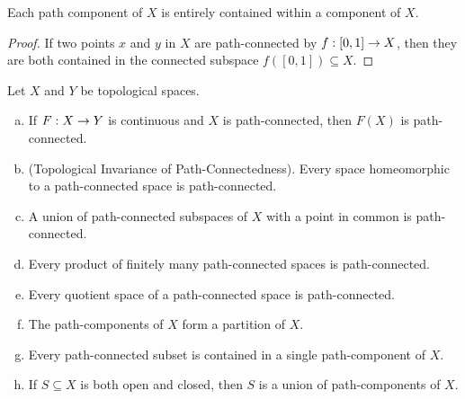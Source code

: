 \documentclass[11pt,a4paper]{article}
\begin{document}
\begin{proposition}\label{prop:path_component_and_component}
Each path component of $X$ is entirely contained within a component of $X$.
\end{proposition}

\begin{proof}
If two points $x$ and $y$ in $X$ are path-connected by $f:[0,1]\rightarrow X$, then they are both contained in the connected subspace $f([0,1])\subseteq X$.
\end{proof}

\begin{proposition} 
\label{prop:path_connectedness}
Let $X$ and $Y$ be topological spaces.
\begin{enumerate}[(a)]
    \item If $F:X\rightarrow Y$ is continuous and $X$ is path-connected, then $F(X)$ is path-connected.
    \item {(Topological Invariance of Path-Connectedness).} Every space homeomorphic to a path-connected space is path-connected.
    \item A union of path-connected subspaces of $X$ with a point in common is path-connected.
    \item Every product of finitely many path-connected spaces is path-connected.
    \item Every quotient space of a path-connected space is path-connected.
    \item The path-components of $X$ form a partition of $X$.
    \item Every path-connected subset is contained in a single path-component of $X$.
    \item If $S\subseteq X$ is both open and closed, then $S$ is a union of path-components of $X$.
\end{enumerate}
\end{proposition}
\end{document}
